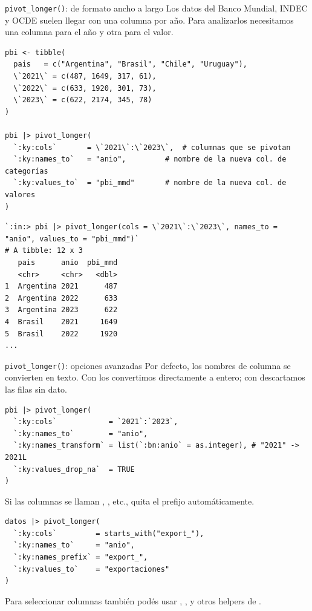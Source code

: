 \documentclass[8pt]{beamer}
\begin{document}
	\begin{frame}[fragile]{\texttt{pivot\_longer()}: de formato ancho a largo}
		Los datos del Banco Mundial, INDEC y OCDE suelen llegar con una columna por año. Para analizarlos necesitamos una columna para el año y otra para el valor.

\begin{lstlisting}[style=RScript]
pbi <- tibble(
  pais   = c("Argentina", "Brasil", "Chile", "Uruguay"),
  \`2021\` = c(487, 1649, 317, 61),
  \`2022\` = c(633, 1920, 301, 73),
  \`2023\` = c(622, 2174, 345, 78)
)

pbi |> pivot_longer(
  `:ky:cols`       = \`2021\`:\`2023\`,  # columnas que se pivotan
  `:ky:names_to`   = "anio",         # nombre de la nueva col. de categorías
  `:ky:values_to`  = "pbi_mmd"       # nombre de la nueva col. de valores
)
\end{lstlisting}
\begin{lstlisting}[style=RConsole]
`:in:> pbi |> pivot_longer(cols = \`2021\`:\`2023\`, names_to = "anio", values_to = "pbi_mmd")`
# A tibble: 12 x 3
   pais      anio  pbi_mmd
   <chr>     <chr>   <dbl>
1  Argentina 2021      487
2  Argentina 2022      633
3  Argentina 2023      622
4  Brasil    2021     1649
5  Brasil    2022     1920
...
\end{lstlisting}
	\end{frame}


	\begin{frame}[fragile]{\texttt{pivot\_longer()}: opciones avanzadas}
		Por defecto, los nombres de columna se convierten en texto. Con  los convertimos directamente a entero; con  descartamos las filas sin dato.
\begin{lstlisting}[style=RScript]
pbi |> pivot_longer(
  `:ky:cols`            = `2021`:`2023`,
  `:ky:names_to`        = "anio",
  `:ky:names_transform` = list(`:bn:anio` = as.integer), # "2021" -> 2021L
  `:ky:values_drop_na`  = TRUE
)
\end{lstlisting}

		Si las columnas se llaman , , etc.,  quita el prefijo automáticamente.
\begin{lstlisting}[style=RScript]
datos |> pivot_longer(
  `:ky:cols`         = starts_with("export_"),
  `:ky:names_to`     = "anio",
  `:ky:names_prefix` = "export_",
  `:ky:values_to`    = "exportaciones"
)
\end{lstlisting}

		\begin{block}{}
			Para seleccionar columnas también podés usar , ,  y otros helpers de .
		\end{block}
	\end{frame}
\end{document}

